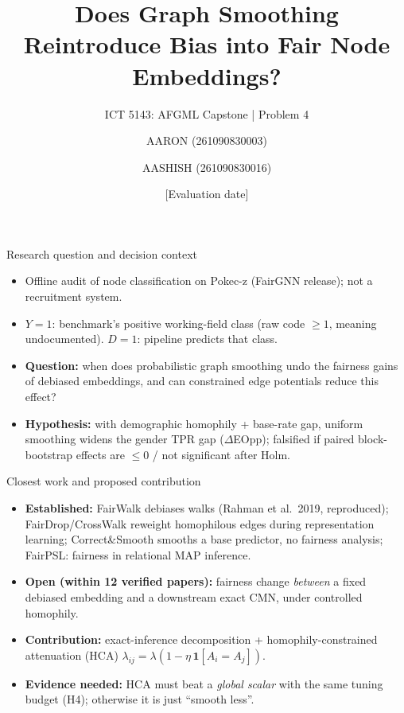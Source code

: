 \documentclass[aspectratio=169,11pt]{beamer}
\title[AFGML Capstone]{Does Graph Smoothing Reintroduce Bias into Fair Node Embeddings?}
\subtitle{ICT 5143: AFGML Capstone | Problem 4}
\author{AARON (261090830003) \and AASHISH (261090830016)}
\date{[Evaluation date]}
\begin{document}
\begin{frame}\titlepage\end{frame}

\begin{frame}{Research question and decision context}
\begin{itemize}
\item Offline audit of node classification on Pokec-z (FairGNN release); not a recruitment system.
\item $Y=1$: benchmark's positive working-field class (raw code $\ge1$, meaning undocumented). $D=1$: pipeline predicts that class.
\item \textbf{Question:} when does probabilistic graph smoothing undo the fairness gains of debiased embeddings, and can constrained edge potentials reduce this effect?
\item \textbf{Hypothesis:} with demographic homophily + base-rate gap, uniform smoothing widens the gender TPR gap ($\Delta$EOpp); falsified if paired block-bootstrap effects are $\le 0$ / not significant after Holm.
\end{itemize}
\end{frame}

\begin{frame}{Closest work and proposed contribution}
\begin{itemize}
\item \textbf{Established:} FairWalk debiases walks (Rahman et al.\ 2019, reproduced); FairDrop/CrossWalk reweight homophilous edges during representation learning; Correct\&Smooth smooths a base predictor, no fairness analysis; FairPSL: fairness in relational MAP inference.
\item \textbf{Open (within 12 verified papers):} fairness change \emph{between} a fixed debiased embedding and a downstream exact CMN, under controlled homophily.
\item \textbf{Contribution:} exact-inference decomposition + homophily-constrained attenuation (HCA) $\lambda_{ij}=\lambda(1-\eta\,\mathbf 1[A_i{=}A_j])$.
\item \textbf{Evidence needed:} HCA must beat a \emph{global scalar} with the same tuning budget (H4); otherwise it is just ``smooth less''.
\end{itemize}
\end{frame}
\end{document}
